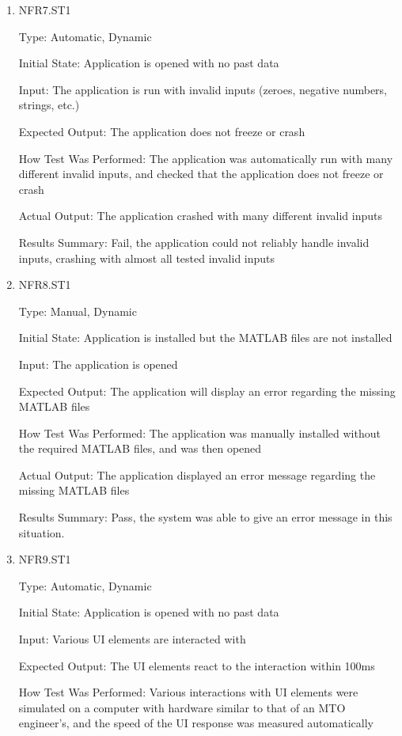 \documentclass[12pt, titlepage]{article}
\begin{document}
\begin{enumerate}

\item{NFR7.ST1\\}

Type: Automatic, Dynamic

Initial State: Application is opened with no past data

Input: The application is run with invalid inputs (zeroes, negative numbers, strings, etc.)

Expected Output: The application does not freeze or crash

How Test Was Performed: The application was automatically run with many different invalid inputs, and checked that the application does not freeze or crash

Actual Output: The application crashed with many different invalid inputs

Results Summary: Fail, the application could not reliably handle invalid inputs, crashing with almost all tested invalid inputs

\item{NFR8.ST1\\}

Type: Manual, Dynamic

Initial State: Application is installed but the MATLAB files are not installed

Input: The application is opened

Expected Output: The application will display an error regarding the missing MATLAB files

How Test Was Performed: The application was manually installed without the required MATLAB files, and was then opened

Actual Output: The application displayed an error message regarding the missing MATLAB files

Results Summary: Pass, the system was able to give an error message in this situation.

\item{NFR9.ST1\\}

Type: Automatic, Dynamic

Initial State: Application is opened with no past data

Input: Various UI elements are interacted with

Expected Output: The UI elements react to the interaction within 100ms

How Test Was Performed: Various interactions with UI elements were simulated on a computer with hardware similar to that of an MTO engineer's, and the speed of the UI response was measured automatically


\end{enumerate}
\end{document}
